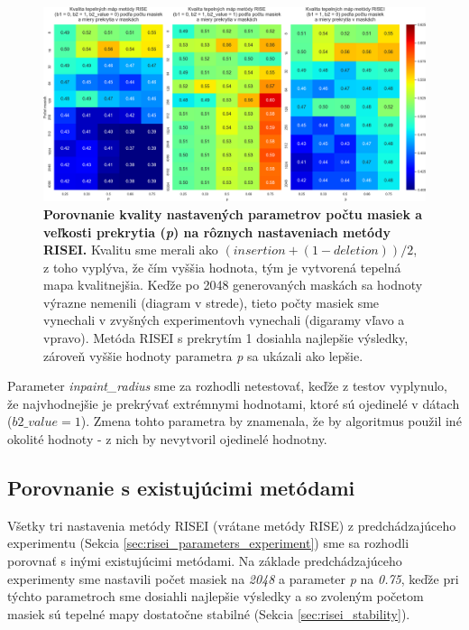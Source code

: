 \begin{figure}
    \centering
    \includegraphics[width=20.6cm]{assets/images/risei_parameters.png}
    \caption{\textbf{Porovnanie kvality nastavených parametrov počtu masiek a veľkosti prekrytia (\textit{p}) na rôznych nastaveniach metódy RISEI.} Kvalitu sme merali ako $(insertion + (1 - deletion)) / 2$, z toho vyplýva, že čím vyššia hodnota, tým je vytvorená tepelná mapa kvalitnejšia. Keďže po 2048 generovaných maskách sa hodnoty výrazne nemenili (diagram v strede), tieto počty masiek sme vynechali v zvyšných experimentovh vynechali (digaramy vľavo a vpravo). Metóda RISEI s prekrytím 1 dosiahla najlepšie výsledky, zároveň vyššie hodnoty parametra \textit{p} sa ukázali ako lepšie.}
    \label{fig:risei_parameters}
\end{figure}

Parameter \textit{inpaint\_radius} sme za rozhodli netestovať, keďže z testov vyplynulo, že najvhodnejšie je prekrývať extrémnymi hodnotami, ktoré sú ojedinelé v dátach ($b2\_value = 1$). Zmena tohto parametra by znamenala, že by algoritmus použil iné okolité hodnoty - z nich by nevytvoril ojedinelé hodnotny.

\subsection{Porovnanie s existujúcimi metódami}

Všetky tri nastavenia metódy RISEI (vrátane metódy RISE) z predchádzajúceho experimentu (Sekcia \ref{sec:risei_parameters_experiment}) sme sa rozhodli porovnať s inými existujúcimi metódami. Na základe predchádzajúceho experimenty sme nastavili počet masiek na \textit{2048} a parameter \textit{p} na \textit{0.75}, keďže pri týchto parametroch sme dosiahli najlepšie výsledky a so zvoleným početom masiek sú tepelné mapy dostatočne stabilné (Sekcia \ref{sec:risei_stability}).

